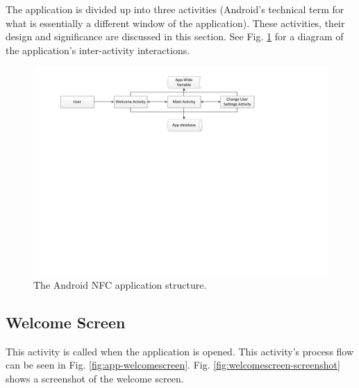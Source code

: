 The application is divided up into three activities (Android's technical term for what
is essentially a different window of the application).  These activities, their design and
significance are discussed in this section. See Fig. \ref{fig:nfc_app_structure} for a
diagram of the application's inter-activity interactions.

\begin{figure}
 \centering 
 \includegraphics[clip = true, trim = 40 410 0 20,
 scale=0.7]{app_structure}
 \caption{The Android NFC application structure.}
 \label{fig:nfc_app_structure}
\end{figure}

\subsection{Welcome Screen}

This activity is called when the application is opened. This
activity's process flow can be seen in Fig. \ref{fig:app-welcomescreen}.
Fig. \ref{fig:welcomescreen-screenshot} shows a screenshot of the welcome
screen.

